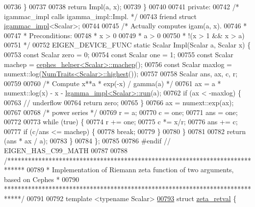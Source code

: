 \begin{DoxyCode}
00736     \}
00737 
00738     \textcolor{keywordflow}{return} Impl(a, x);
00739   \}
00740 
00741  \textcolor{keyword}{private}:
00742   \textcolor{comment}{/* igammac\_impl calls igamma\_impl::Impl. */}
00743   \textcolor{keyword}{friend} \textcolor{keyword}{struct }\hyperlink{struct_eigen_1_1internal_1_1igammac__impl}{igammac\_impl}<Scalar>;
00744 
00745   \textcolor{comment}{/* Actually computes igam(a, x).}
00746 \textcolor{comment}{   *}
00747 \textcolor{comment}{   * Preconditions:}
00748 \textcolor{comment}{   *   x > 0}
00749 \textcolor{comment}{   *   a > 0}
00750 \textcolor{comment}{   *   !(x > 1 && x > a)}
00751 \textcolor{comment}{   */}
00752   EIGEN\_DEVICE\_FUNC \textcolor{keyword}{static} Scalar Impl(Scalar a, Scalar x) \{
00753     \textcolor{keyword}{const} Scalar zero = 0;
00754     \textcolor{keyword}{const} Scalar one = 1;
00755     \textcolor{keyword}{const} Scalar machep = \hyperlink{struct_eigen_1_1internal_1_1cephes__helper}{cephes\_helper<Scalar>::machep}();
00756     \textcolor{keyword}{const} Scalar maxlog = numext::log(\hyperlink{group___core___module_struct_eigen_1_1_num_traits}{NumTraits<Scalar>::highest}());
00757 
00758     Scalar ans, ax, c, r;
00759 
00760     \textcolor{comment}{/* Compute  x**a * exp(-x) / gamma(a)  */}
00761     ax = a * numext::log(x) - x - \hyperlink{struct_eigen_1_1internal_1_1lgamma__impl}{lgamma\_impl<Scalar>::run}(a);
00762     \textcolor{keywordflow}{if} (ax < -maxlog) \{
00763       \textcolor{comment}{// underflow}
00764       \textcolor{keywordflow}{return} zero;
00765     \}
00766     ax = numext::exp(ax);
00767 
00768     \textcolor{comment}{/* power series */}
00769     r = a;
00770     c = one;
00771     ans = one;
00772 
00773     \textcolor{keywordflow}{while} (\textcolor{keyword}{true}) \{
00774       r += one;
00775       c *= x/r;
00776       ans += c;
00777       \textcolor{keywordflow}{if} (c/ans <= machep) \{
00778         \textcolor{keywordflow}{break};
00779       \}
00780     \}
00781 
00782     \textcolor{keywordflow}{return} (ans * ax / a);
00783   \}
00784 \};
00785 
00786 \textcolor{preprocessor}{#endif  // EIGEN\_HAS\_C99\_MATH}
00787 
00788 \textcolor{comment}{/*****************************************************************************}
00789 \textcolor{comment}{ * Implementation of Riemann zeta function of two arguments, based on Cephes *}
00790 \textcolor{comment}{ *****************************************************************************/}
00791 
00792 \textcolor{keyword}{template} <\textcolor{keyword}{typename} Scalar>
\hyperlink{struct_eigen_1_1internal_1_1zeta__retval}{00793} \textcolor{keyword}{struct }\hyperlink{struct_eigen_1_1internal_1_1zeta__retval}{zeta\_retval} \{

\end{DoxyCode}
